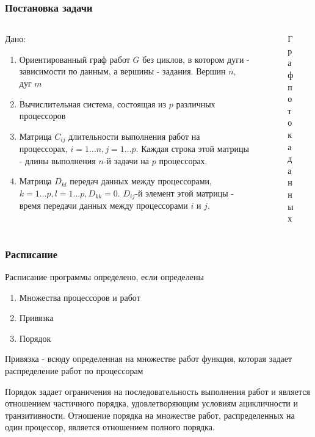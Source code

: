 \begin{frame}
    \frametitle{Постановка задачи}
    \begin{columns}
        \begin{column}{0.60\textwidth}
            Дано:
            \begin{enumerate}
                \item Ориентированный граф работ $G$ без циклов, в котором дуги - зависимости по данным, а вершины - задания. Вершин $n$, дуг $m$
                \item Вычислительная система, состоящая из $p$ различных процессоров
                \item Матрица $C_{ij}$ длительности выполнения работ на процессорах, $i=1 \dots n, j=1 \dots p$. Каждая строка этой матрицы - длины выполнения $n$-й задачи на $p$ процессорах. 
                \item Матрица $D_{kl}$ передач данных между процессорами, $k=1 \dots p, l = 1 \dots p, D_{kk} = 0$. $D_{ij}$-й элемент этой матрицы - время передачи данных между процессорами $i$ и $j$.
            \end{enumerate}
        \end{column}
        \begin{column}{0.40\textwidth}
            \begin{figure}
                \captionsetup{labelformat=empty}
                \caption{Граф потока данных}
            \end{figure}
        \end{column}
    \end{columns}
\end{frame}

\begin{frame}
    \frametitle{Расписание}
    Расписание программы определено, если определены
    \begin{enumerate}
        \item Множества процессоров и работ
        \item Привязка
        \item Порядок
    \end{enumerate}
    \par
    Привязка - всюду определенная на множестве работ функция, которая задает распределение работ по процессорам
    \par
    Порядок задает ограничения на последовательность выполнения работ и является отношением частичного порядка, удовлетворяющим условиям ацикличности и транзитивности. Отношение порядка на множестве работ, распределенных на \\один процессор, является отношением полного порядка.
\end{frame}

